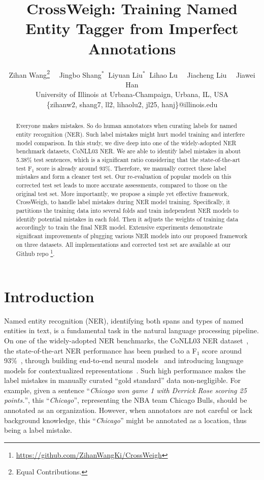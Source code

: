 \documentclass[11pt,a4paper]{article}
\title{CrossWeigh: Training Named Entity Tagger from Imperfect Annotations}
\author{
Zihan Wang\thanks{\; Equal Contributions.}$\quad$
Jingbo Shang$^{*}\ $
Liyuan Liu$^{*}\ $
Lihao Lu$\quad$ 
Jiacheng Liu$\quad$ 
Jiawei Han
\\[0.5ex]
University of Illinois at Urbana-Champaign, Urbana, IL, USA\\
\{zihanw2, shang7, ll2, lihaolu2, jl25, hanj\}@illinois.edu
}
\date{}
\newcommand{\our}{\mbox{\sf CrossWeigh}\xspace}
\begin{document}
\maketitle
\begin{abstract}
  Everyone makes mistakes.
So do human annotators when curating labels for named entity recognition (NER). 
Such label mistakes might hurt model training and interfere model comparison.
In this study, we dive deep into one of the widely-adopted NER benchmark datasets, CoNLL03 NER.
We are able to identify label mistakes in about 5.38\% test sentences, which is a significant ratio considering that the state-of-the-art test F$_1$ score is already around 93\%.
Therefore, we manually correct these label mistakes and form a cleaner test set.
Our re-evaluation of popular models on this corrected test set leads to more accurate assessments, compared to those on the original test set.
More importantly, we propose a simple yet effective framework, \our, to handle label mistakes during NER model training.
Specifically, it partitions the training data into several folds and train independent NER models to identify potential mistakes in each fold.
Then it adjusts the weights of training data accordingly to train the final NER model.
Extensive experiments demonstrate significant improvements of plugging various NER models into our proposed framework on three datasets. 
All implementations and corrected test set are available at our Github repo \footnote{\url{https://github.com/ZihanWangKi/CrossWeigh}}.
 \end{abstract}


\section{Introduction}

Named entity recognition (NER), identifying both spans and types of named entities in text, is a fundamental task in the natural language processing pipeline.
On one of the widely-adopted NER benchmarks, the CoNLL03 NER dataset~\cite{sang2003introduction}, the state-of-the-art NER performance has been pushed to a F$_1$ score around 93\%~\cite{akbikpooled},
through building end-to-end neural models~\cite{lample2016neural,ma2016end} and introducing language models for contextualized representations~\cite{peters2017semi,peters2018deep,akbik2018contextual,liu2018efficient}.
Such high performance makes the label mistakes in manually curated ``gold standard'' data non-negligible.
For example, given a sentence ``\emph{Chicago won game 1 with Derrick Rose scoring 25 points.}'', this ``\emph{Chicago}'', representing the NBA team Chicago Bulls, should be annotated as an organization.
However, when annotators are not careful or lack background knowledge, this ``\emph{Chicago}'' might be annotated as a location, thus being a label mistake.
\end{document}
